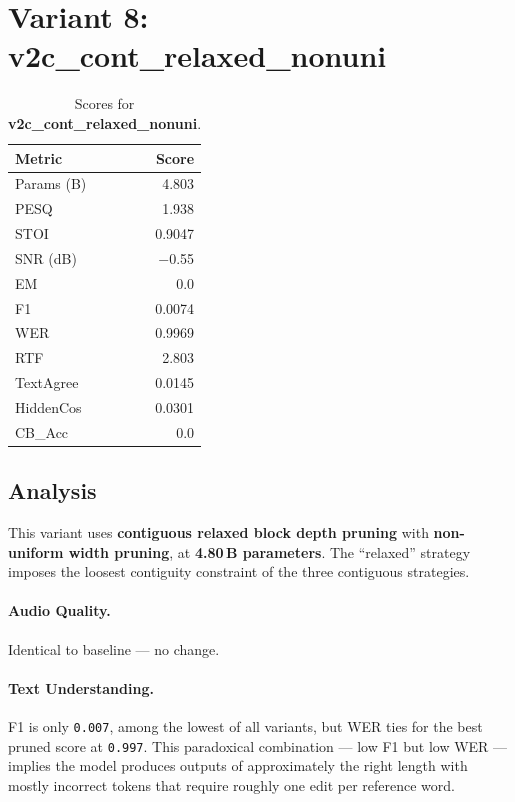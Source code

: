 \documentclass[11pt,a4paper]{article}
\newcommand{\scoreval}[1]{\texttt{#1}}
\begin{document}
\newpage
\section{Variant 8: v2c\_cont\_relaxed\_nonuni}

\begin{table}[H]
\centering
\caption{Scores for \textbf{v2c\_cont\_relaxed\_nonuni}.}
\begin{tabular}{l r}
\toprule
\textbf{Metric} & \textbf{Score} \\
\midrule
Params (B)    & 4.803 \\
PESQ          & 1.938 \\
STOI          & 0.9047 \\
SNR (dB)      & $-$0.55 \\
EM            & 0.0 \\
F1            & 0.0074 \\
WER           & 0.9969 \\
RTF           & 2.803 \\
TextAgree     & 0.0145 \\
HiddenCos     & 0.0301 \\
CB\_Acc       & 0.0 \\
\bottomrule
\end{tabular}
\end{table}

\subsection{Analysis}

This variant uses \textbf{contiguous relaxed block depth pruning} with \textbf{non-uniform width pruning}, at \textbf{4.80\,B parameters}. The ``relaxed'' strategy imposes the loosest contiguity constraint of the three contiguous strategies.

\paragraph{Audio Quality.}
Identical to baseline — no change.

\paragraph{Text Understanding.}
F1 is only \scoreval{0.007}, among the lowest of all variants, but WER ties for the best pruned score at \scoreval{0.997}. This paradoxical combination — low F1 but low WER — implies the model produces outputs of approximately the right length with mostly incorrect tokens that require roughly one edit per reference word.
\end{document}
